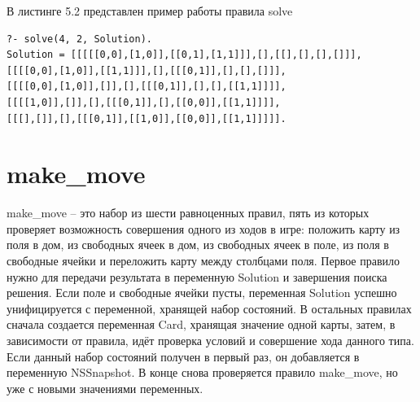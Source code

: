 \documentclass[12pt]{report}
\begin{document}
В листинге 5.2 представлен пример работы правила solve
\begin{lstlisting}[caption=пример работы правила solve]
?- solve(4, 2, Solution).
Solution = [[[[[0,0],[1,0]],[[0,1],[1,1]]],[],[[],[],[],[]]],
[[[[0,0],[1,0]],[[1,1]]],[],[[[0,1]],[],[],[]]],
[[[[0,0],[1,0]],[]],[],[[[0,1]],[],[],[[1,1]]]],
[[[[1,0]],[]],[],[[[0,1]],[],[[0,0]],[[1,1]]]],
[[[],[]],[],[[[0,1]],[[1,0]],[[0,0]],[[1,1]]]]].
\end{lstlisting}
\section{make\_move}
make\_move – это набор из шести равноценных правил, пять из которых проверяет возможность совершения одного из ходов в игре: положить карту из поля в дом, из свободных ячеек в дом, из свободных ячеек в поле, из поля в свободные ячейки и переложить карту между столбцами поля. Первое правило нужно для передачи результата в переменную Solution и завершения поиска решения. Если поле и свободные ячейки пусты, переменная Solution успешно унифицируется с переменной, хранящей набор состояний. В остальных правилах сначала создается переменная Card, хранящая значение одной карты, затем, в зависимости от правила, идёт проверка условий и совершение хода данного типа. Если данный набор состояний получен в первый раз, он добавляется в переменную NSSnapshot. В конце снова проверяется правило make\_move, но уже с новыми значениями переменных.
\end{document}
